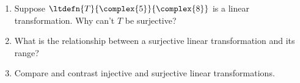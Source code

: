 \begin{enumerate}
%
\item Suppose $\ltdefn{T}{\complex{5}}{\complex{8}}$ is a linear transformation.  Why can't $T$ be surjective?
%
\item What is the relationship between a surjective linear transformation and its range?
%
\item Compare and contrast injective and surjective linear transformations.
%
\end{enumerate}